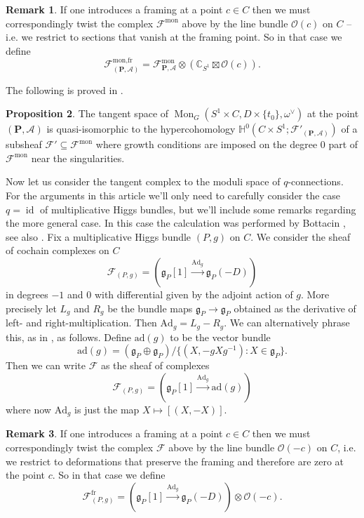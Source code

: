 \documentclass[11pt, oneside, reqno]{amsart}
\theoremstyle{definition} \newtheorem{definition}{Definition}[section]
\newtheorem{prop}[definition]{Proposition}
\theoremstyle{definition} \newtheorem{remark}[definition]{Remark}
\theoremstyle{definition} \newtheorem{remarks}[definition]{Remarks}
\theoremstyle{definition} \newtheorem{question}[definition]{Question}
\theoremstyle{definition} \newtheorem*{note}{Note}
\theoremstyle{definition} \newtheorem{example}[definition]{Example}
\theoremstyle{definition} \newtheorem{examples}[definition]{Examples}
\renewcommand{\gg}{\mathfrak{g}}
\newcommand{\bb}[1]{\mathbb{#1}}
\newcommand{\mr}[1]{\mathrm{#1}}
\newcommand{\mc}[1]{\mathcal{#1}}
\newcommand{\bo}[1]{\boldsymbol{#1}}
\newcommand{\CC}{\mathbb{C}}
\newcommand{\OO}{\mathcal{O}}
\newcommand{\sub}{\subseteq}
\DeclareMathOperator{\id}{id}
\DeclareMathOperator{\mon}{Mon}
\newcommand{\fr}{\mathrm{fr}}
\newcommand{\ad}{\mr{ad}}
\newcommand{\Ad}{\mr{Ad}}
\begin{document}
\begin{remark}
If one introduces a framing at a point $c \in C$ then we must correspondingly twist the complex $\mc F^{\mr{mon}}$ above by the line bundle $\OO(c)$ on $C$ -- i.e. we restrict to sections that vanish at the framing point.  So in that case we define
\[\mc F^{\text{mon,fr}}_{(\bo P,\mc A)} = \mc F^{\mr{mon}}_{\bo P, \mc A} \otimes (\CC_{S^1} \boxtimes \OO(c)).\]
\end{remark}

The following is proved in \cite{FoscoloDef}.
 
\begin{prop}
The tangent space of $\mon_G(S^1 \times C, D \times \{t_0\}, \omega^\vee)$ at the point $(\bo P,\mc A)$ is quasi-isomorphic to the hypercohomology $\bb H^0(C \times S^1; \mc F'_{(\bo P,\mc A)})$ of a subsheaf $\mc F' \sub \mc F^{\mr{mon}}$ where growth conditions are imposed on the degree 0 part of $\mc F^{\mr{mon}}$ near the singularities.
\end{prop}

Now let us consider the tangent complex to the moduli space of $q$-connections.  For the arguments in this article we'll only need to carefully consider the case $q=\id$ of multiplicative Higgs bundles, but we'll include some remarks regarding the more general case.  In this case the calculation was performed by Bottacin \cite{Bottacin}, see also \cite[Section 4]{HurtubiseMarkman}. Fix a multiplicative Higgs bundle $(P,g)$ on $C$.  We consider the sheaf of cochain complexes on $C$
\[\mc F_{(P,g)} = (\gg_P[1] \overset {\Ad_g} {\to} \gg_P(-D))\]
in degrees $-1$ and 0 with differential given by the adjoint action of $g$.  More precisely let $L_g$ and $R_g$ be the bundle maps $\gg_P \to \gg_P$ obtained as the derivative of left- and right-multiplication.  Then $\Ad_g = L_g - R_g$.  We can alternatively phrase this, as in \cite[Section 4]{HurtubiseMarkman}, as follows.  Define $\ad(g)$ to be the vector bundle
\[\ad(g) = (\gg_P \oplus \gg_P)/\{(X, -g X g^{-1}): X \in \gg_P\}.\]
Then we can write $\mc F$ as the sheaf of complexes
\[\mc F_{(P,g)} = (\gg_P[1] \overset {\Ad_g} {\to} \ad(g))\]
where now $\Ad_g$ is just the map $X \mapsto [(X,-X)]$.

\begin{remark}
  If one introduces a framing at a point $c \in C$ then we must correspondingly twist the complex $\mc F$ above by the line bundle $\OO(-c)$ on $C$, i.e. we restrict to deformations that preserve the framing and therefore are zero at the point $c$.  So in that case we define
\[\mc F^\fr_{(P,g)} = (\gg_P[1] \overset {\Ad_g} {\to} \gg_P(-D)) \otimes \OO(-c).\]
\end{remark}
\end{document}
